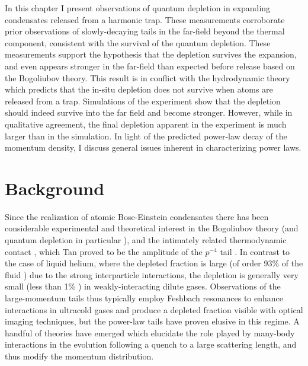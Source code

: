 	In this chapter I present observations of quantum depletion in expanding condensates released from a harmonic trap. These measurements corroborate prior observations \cite{Chan16} of slowly-decaying tails in the far-field beyond the thermal component, consistent with the survival of the quantum depletion. These measurements support the hypothesis that the depletion survives the expansion, and even appears stronger in the far-field than expected before release based on the Bogoliubov theory. This result is in conflict with the hydrodynamic theory which predicts that the in-situ depletion does not survive when atoms are released from a trap.  Simulations of the experiment show that the depletion should indeed survive into the far field and become stronger. However, while in qualitative agreement, the final depletion apparent in the experiment is much larger than in the simulation. In light of the predicted power-law decay of the momentum density, I discuss general issues inherent in characterizing power laws. 

\section{Background}
	Since the realization of atomic Bose-Einstein condensates there has been considerable experimental \cite{Stewart10,Wild12,Chang16,Makotyn14,Eigen18,Xu06,Vogels02,Pieczarka20,Lopes17_depletion,Cayla20,Kuhnle11,Sagi12,Fletcher17,Lopes17_quasiparticle,Mukherjee19,Carcy19} and 
	theoretical \cite{Colussi20,Kira15_coherent,Decamp18,Smith14,Qu16,Braaten10,Braaten11,Rakhimov20,Braaten08,Zhang09,Combescot09,Werner12_boson,Werner12_fermion,Sinatra00,Deuar11} interest in the 
	Bogoliubov theory \cite{Vogels02,Steinhauer03,Lopes17_quasiparticle,Sinatra00,Deuar11} (and 
	quantum depletion in particular \cite{Lopes17_depletion,Chang16,Xu06,Pieczarka20,Cayla20}), 
	and the intimately related thermodynamic 
	contact \cite{Stewart10,Tan08_momentum,Tan08_energetics,Tan08_virial, Braaten10,Braaten11,Colussi20,Makotyn14,Eigen18,Decamp18,Smith14,Chang16,Qu16,Wild12,Hoinka15,Rakhimov20,Braaten08,Smith14,Kuhnle11,Sagi12,Fletcher17,Mukherjee19,Carcy19,Zhang09,Combescot09,Werner12_boson,Werner12_fermion}, which Tan proved to be the amplitude of the $p^{-4}$ tail \cite{Tan08_momentum}.
	In contrast to the case of liquid helium, where the depleted fraction is large (of order 93\% of the fluid \cite{Dmowski17,Glyde00,Moroni04}) due to the strong interparticle interactions, the depletion is generally very small (less than 1\% \cite{Lopes17_depletion,Chang16}) in weakly-interacting dilute gases.
	Observations of the large-momentum tails thus typically employ Feshbach resonances to enhance interactions in ultracold gases and produce a depleted fraction visible with optical imaging techniques, but the power-law tails have proven elusive \cite{Makotyn14,Eigen18} in this regime. 
	A handful of theories have emerged \cite{Kira15_coherent,Colussi20,Smith14} which elucidate the role played by many-body interactions in the evolution following a quench to a large scattering length, and thus modify the momentum distribution.

